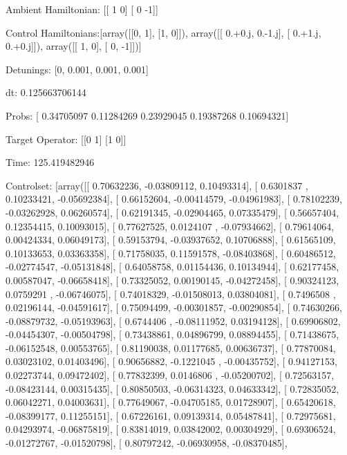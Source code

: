 \documentclass{article}
\begin{document}
    

\newpage

Ambient Hamiltonian: [[ 1  0]
 [ 0 -1]]

Control Hamiltonians:[array([[0, 1],
       [1, 0]]), array([[ 0.+0.j,  0.-1.j],
       [ 0.+1.j,  0.+0.j]]), array([[ 1,  0],
       [ 0, -1]])]

Detunings: [0, 0.001, 0.001, 0.001]

 dt: 0.125663706144

Probs: [ 0.34705097  0.11284269  0.23929045  0.19387268  0.10694321]

Target Operator: [[0 1]
 [1 0]]

Time: 125.419482946

Controlset: [array([[ 0.70632236, -0.03809112,  0.10493314],
       [ 0.6301837 ,  0.10233421, -0.05692384],
       [ 0.66152604, -0.00414579, -0.04961983],
       [ 0.78102239, -0.03262928,  0.06260574],
       [ 0.62191345, -0.02904465,  0.07335479],
       [ 0.56657404,  0.12354415,  0.10093015],
       [ 0.77627525,  0.0124107 , -0.07934662],
       [ 0.79614064,  0.00424334,  0.06049173],
       [ 0.59153794, -0.03937652,  0.10706888],
       [ 0.61565109,  0.10133653,  0.03363358],
       [ 0.71758035,  0.11591578, -0.08403868],
       [ 0.60486512, -0.02774547, -0.05131848],
       [ 0.64058758,  0.01154436,  0.10134944],
       [ 0.62177458,  0.00587047, -0.06658418],
       [ 0.73325052,  0.00190145, -0.04272458],
       [ 0.90324123,  0.0759291 , -0.06746075],
       [ 0.74018329, -0.01508013,  0.03804081],
       [ 0.7496508 ,  0.02196144, -0.04591617],
       [ 0.75094499, -0.00301857, -0.00290854],
       [ 0.74630266, -0.08879732, -0.05193963],
       [ 0.6744406 , -0.08111952,  0.03194128],
       [ 0.69906802, -0.04454307, -0.00504798],
       [ 0.73438861,  0.04896799,  0.08894455],
       [ 0.71438675, -0.06152548,  0.00553765],
       [ 0.81190038,  0.01177685,  0.00636737],
       [ 0.77870084,  0.03023102,  0.01403496],
       [ 0.90656882, -0.1221045 , -0.00435752],
       [ 0.94127153,  0.02273744,  0.09472402],
       [ 0.77832399,  0.0146806 , -0.05200702],
       [ 0.72563157, -0.08423144,  0.00315435],
       [ 0.80850503, -0.06314323,  0.04633342],
       [ 0.72835052,  0.06042271,  0.04003631],
       [ 0.77649067, -0.04705185,  0.01728907],
       [ 0.65420618, -0.08399177,  0.11255151],
       [ 0.67226161,  0.09139314,  0.05487841],
       [ 0.72975681,  0.04293974, -0.06875819],
       [ 0.83814019,  0.03842002,  0.00304929],
       [ 0.69306524, -0.01272767, -0.01520798],
       [ 0.80797242, -0.06930958, -0.08370485],
\end{document}
